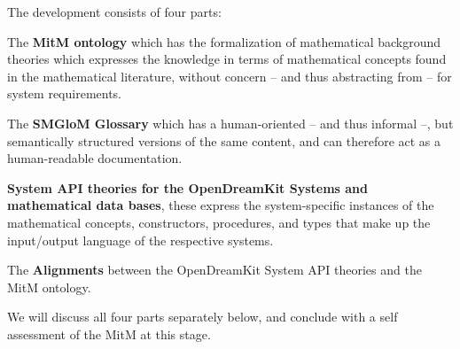 The development consists of four parts:
\begin{compactenum}[\em i\rm)]
\item The \textbf{MitM ontology} which has the formalization of mathematical background theories
  which expresses the knowledge in terms of mathematical concepts found in the
  mathematical literature, without concern -- and thus abstracting from -- for system
  requirements.
\item The \textbf{SMGloM Glossary} which has a human-oriented -- and thus informal --, but
  semantically structured versions of the same content, and can therefore act as a
  human-readable documentation.
\item \textbf{System API theories for the OpenDreamKit Systems and mathematical data bases}, these
  express the system-specific instances of the mathematical concepts, constructors,
  procedures, and types that make up the input/output language of the respective systems.
\item The \textbf{Alignments} between the OpenDreamKit System API theories and the MitM ontology. 
\end{compactenum}
We will discuss all four parts separately below, and conclude with a self assessment of the MitM at this stage.


